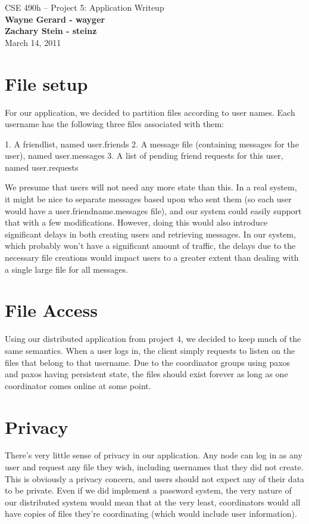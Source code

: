 \documentclass[11pt]{article}
\begin{document}
\begin{center}
{\large CSE 490h -- Project 5: Application Writeup} \\
\textbf{Wayne Gerard - wayger} \\
\textbf{Zachary Stein - steinz} \\
March 14, 2011
\end{center}

\section{File setup}

For our application, we decided to partition files according to user names. Each username has the following three files associated with them:

1. A friendlist, named user.friends
2. A message file (containing messages for the user), named user.messages
3. A list of pending friend requests for this user, named user.requests

We presume that users will not need any more state than this. In a real system, it might be nice to separate messages based upon who sent them (so each user would have a user.friendname.messages file), and our system could easily support that with a few modifications. However, doing this would also introduce significant delays in both creating users and retrieving messages. In our system, which probably won't have a significant amount of traffic, the delays due to the necessary file creations would impact users to a greater extent than dealing with a single large file for all messages.

\section{File Access}

Using our distributed application from project 4, we decided to keep much of the same semantics. When a user logs in, the client simply requests to listen on the files that belong to that username. Due to the coordinator groups using paxos and paxos having persistent state, the files should exist forever as long as one coordinator comes online at some point.

\section{Privacy}

There's very little sense of privacy in our application. Any node can log in as any user and request any file they wish, including usernames that they did not create. This is obviously a privacy concern, and users should not expect any of their data to be private. Even if we did implement a password system, the very nature of our distributed system would mean that at the very least, coordinators would all have copies of files they're coordinating (which would include user information). 
\end{document}
